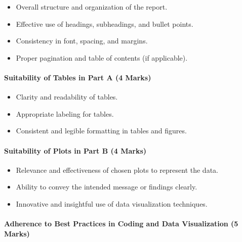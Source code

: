 \documentclass[
  letterpaper,
  DIV=11,
  numbers=noendperiod]{scrartcl}
\let\oldparagraph\paragraph
\renewcommand{\paragraph}[1]{\oldparagraph{#1}\mbox{}}
\providecommand{\tightlist}{%
  \setlength{\itemsep}{0pt}\setlength{\parskip}{0pt}}\usepackage{longtable,booktabs,array}
\begin{document}
\begin{itemize}
\tightlist
\item
  Overall structure and organization of the report.
\item
  Effective use of headings, subheadings, and bullet points.
\item
  Consistency in font, spacing, and margins.
\item
  Proper pagination and table of contents (if applicable).
\end{itemize}

\hypertarget{suitability-of-tables-in-part-a-4-marks}{%
\paragraph{Suitability of Tables in Part A (4
Marks)}\label{suitability-of-tables-in-part-a-4-marks}}

\begin{itemize}
\tightlist
\item
  Clarity and readability of tables.
\item
  Appropriate labeling for tables.
\item
  Consistent and legible formatting in tables and figures.
\end{itemize}

\hypertarget{suitability-of-plots-in-part-b-4-marks}{%
\paragraph{Suitability of Plots in Part B (4
Marks)}\label{suitability-of-plots-in-part-b-4-marks}}

\begin{itemize}
\tightlist
\item
  Relevance and effectiveness of chosen plots to represent the data.
\item
  Ability to convey the intended message or findings clearly.
\item
  Innovative and insightful use of data visualization techniques.
\end{itemize}

\hypertarget{adherence-to-best-practices-in-coding-and-data-visualization-5-marks}{%
\paragraph{Adherence to Best Practices in Coding and Data Visualization
(5
Marks)}\label{adherence-to-best-practices-in-coding-and-data-visualization-5-marks}}
\end{document}
